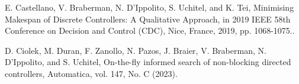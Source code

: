 \documentclass[11pt]{jarticle}
\begin{document}

\begin{thebibliography}{99} %
{\footnotesize

E. Castellano, V. Braberman, N. D'Ippolito, S. Uchitel, and K. Tei, 
Minimising Makespan of Discrete Controllers: A Qualitative Approach,
in 2019 IEEE 58th
Conference on Decision and Control (CDC), Nice, France, 2019, pp. 1068-1075..

D. Ciolek, M. Duran, F. Zanollo, N. Pazos, J. Braier, V. Braberman, N. D'Ippolito, and S.
Uchitel, On-the-fly informed search of non-blocking directed controllers,
Automatica, vol. 147, No. C (2023).

}
\end{thebibliography} %

\end{document}
